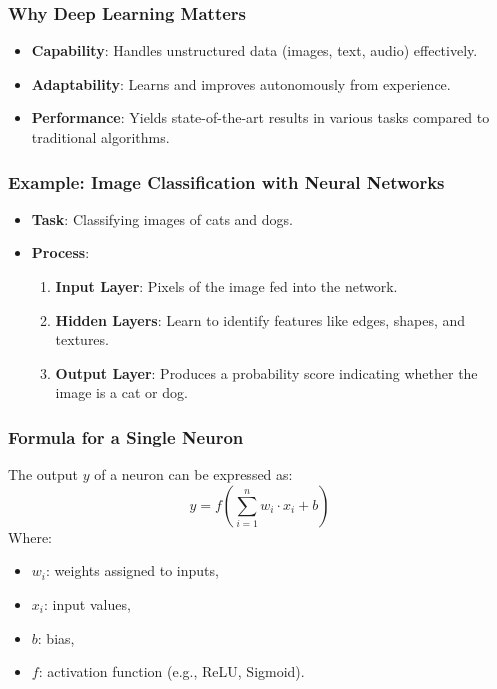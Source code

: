 \documentclass[aspectratio=169]{beamer}
\begin{document}
\begin{frame}[fragile]
    \frametitle{Why Deep Learning Matters}
    \begin{itemize}
        \item \textbf{Capability}: Handles unstructured data (images, text, audio) effectively.
        \item \textbf{Adaptability}: Learns and improves autonomously from experience.
        \item \textbf{Performance}: Yields state-of-the-art results in various tasks compared to traditional algorithms.
    \end{itemize}
\end{frame}

\begin{frame}[fragile]
    \frametitle{Example: Image Classification with Neural Networks}
    \begin{itemize}
        \item \textbf{Task}: Classifying images of cats and dogs.
        \item \textbf{Process}:
        \begin{enumerate}
            \item \textbf{Input Layer}: Pixels of the image fed into the network.
            \item \textbf{Hidden Layers}: Learn to identify features like edges, shapes, and textures.
            \item \textbf{Output Layer}: Produces a probability score indicating whether the image is a cat or dog.
        \end{enumerate}
    \end{itemize}
\end{frame}

\begin{frame}[fragile]
    \frametitle{Formula for a Single Neuron}
    The output \( y \) of a neuron can be expressed as:
    \begin{equation}
        y = f\left(\sum_{i=1}^{n} w_i \cdot x_i + b\right)
    \end{equation}
    Where:
    \begin{itemize}
        \item \( w_i \): weights assigned to inputs,
        \item \( x_i \): input values,
        \item \( b \): bias,
        \item \( f \): activation function (e.g., ReLU, Sigmoid).
    \end{itemize}
\end{frame}
\end{document}
